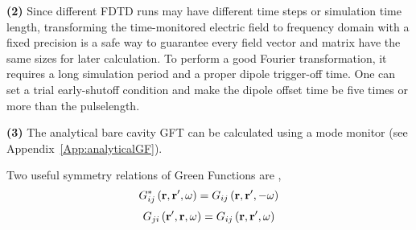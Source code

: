 \textbf{(2)} Since different FDTD runs may have different time steps or simulation time length,
transforming the time-monitored electric field to frequency domain with a fixed precision is a safe way
to guarantee every field vector and matrix have the same sizes for later calculation.
To perform a good Fourier transformation, it requires a long simulation period and a proper dipole trigger-off time.
One can set a trial early-shutoff condition and
make the dipole offset time be five times or more than the pulselength.

\textbf{(3)} The analytical bare cavity GFT can be calculated using a mode monitor (see Appendix~\ref{App:analyticalGF}).

Two useful symmetry relations of Green Functions are \cite{Raabe2005},
\begin{equation}
\label{symG1}
 G_{ij}^{*} \left(\mathbf{r},\mathbf{r}',\omega\right) = G_{ij} \left(\mathbf{r},\mathbf{r}',-\omega\right)
\end{equation}
\begin{equation}
\label{symG2}
 G_{ji} \left(\mathbf{r}',\mathbf{r},\omega\right) = G_{ij} \left(\mathbf{r},\mathbf{r}',\omega\right)
\end{equation} 